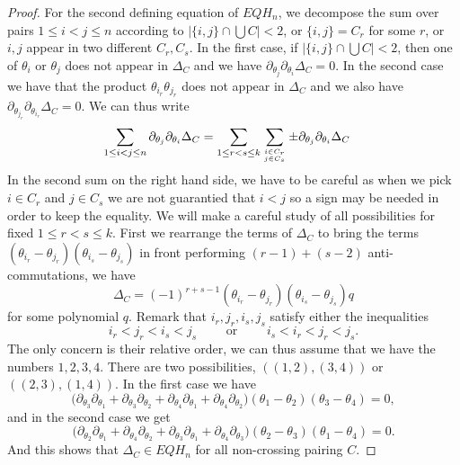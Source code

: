 \documentclass[11pt]{amsart}
\theoremstyle{definition}
\numberwithin{equation}{section}
\begin{document}
\begin{proof}
For the second defining equation of $EQH_n $, we decompose the sum over pairs $1\le i<j\le n$ according to $|\{i,j\}\cap \bigcup C|<2$, or $\{i,j\}=C_r$ for some $r$, or $i,j$ appear in two different $C_{r},C_{s}$. In the first case, if  $|\{i,j\}\cap \bigcup C|<2$, then one of $\theta_i$ or $\theta_j$ does not appear in $\Delta_C$ and we have $ \partial_{\theta_j} \partial_{\theta_i}\Delta_C=0$. In the second case we have that the product $\theta_{i_r}\theta_{j_r}$ does not appear in $\Delta_C$ and we also have $ \partial_{\theta_{j_r}} \partial_{\theta_{i_r}}\Delta_C=0$.
We can thus write
\begin{align*}
 \sum_{1\le i<j\le n} \partial_{\theta_j}\partial_{\theta_i}\Delta_C&= \sum_{1\le r<s\le k} \sum_{i\in C_{r} \atop j\in C_{s}} \pm  \partial_{\theta_j}\partial_{\theta_i}\Delta_C
\end{align*}
In the second sum on the right hand side, we have to be careful as when we pick $i\in C_{r}$ and $ j\in C_{s}$ we are not guarantied that $i<j$ so a sign may be needed 
in  order to keep the equality. We will make a careful study of all possibilities for fixed $1\le r<s\le k$. First we rearrange the terms of $\Delta_C$ to  bring the terms 
$(\theta_{i_{r}}-\theta_{j_{r}})(\theta_{i_{s}}-\theta_{j_{s}})$ in front  performing $(r-1)+(s-2)$ anti-commutations, we have 
  $$\Delta_C  =(-1)^{r+s-1}(\theta_{i_{r}}-\theta_{j_{r}})(\theta_{i_{s}}-\theta_{j_{s}})q$$
  for some polynomial $q$. Remark that $i_{r},j_{r},i_{s},j_{s}$ satisfy either the inequalities
  $$  i_r<j_r<i_s<j_s \qquad \text{ or }\qquad  i_s<i_r<j_r<j_s.$$
 The only concern is their relative order, we can thus assume that we have the numbers $1,2,3,4$.
  There are two possibilities, $((1,2),(3,4))$ or $((2,3),(1,4))$.
  In the first case we have
$$ \big( \partial_{\theta_3}\partial_{\theta_1} +  \partial_{\theta_3}\partial_{\theta_2} +  \partial_{\theta_4}\partial_{\theta_1} +  \partial_{\theta_4}\partial_{\theta_2}\big)
     (\theta_{1}-\theta_{2})(\theta_{3}-\theta_{4}) =0,
$$  
 and in the second case we get 
$$ \big( \partial_{\theta_2}\partial_{\theta_1} +  \partial_{\theta_4}\partial_{\theta_2} +  \partial_{\theta_3}\partial_{\theta_1} +  \partial_{\theta_4}\partial_{\theta_3}\big)
     (\theta_{2}-\theta_{3})(\theta_{1}-\theta_{4}) =0.
$$  
And this shows that $\Delta_C\in EQH_n $ for all non-crossing pairing $C$.
\end{proof}
\end{document}

